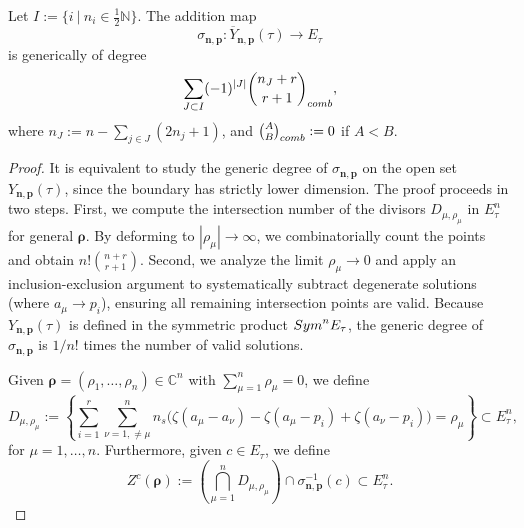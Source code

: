 \documentclass[10pt,a4paper]{amsart}
\begin{document}
\begin{theorem} \label{thm_deg}
Let $I := \{ i\ |\ n_i \in \tfrac{1}{2}\mathbb{N} \}$. The addition map
\[
\sigma_{\mathbf{n},\mathbf{p}}: \overline{Y}_{\mathbf{n},\mathbf{p}}(\tau) \to E_\tau
\] 
is generically of degree 
\[
    \sum_{J \subset I} (-1)^{|J|} \binom{n_J +r}{r+1}_{\rm comb},
\]
where $n_J := n - \sum_{j \in J}(2n_j +1)$, and $\binom{A}{B}_{\rm comb} := 0$ if $A<B$.
\end{theorem}

\begin{proof}
It is equivalent to study the generic degree of $\sigma_{\mathbf{n},\mathbf{p}}$ on the open set $Y_{\mathbf{n}, \mathbf{p}}(\tau)$, since the boundary has strictly lower dimension.
The proof proceeds in two steps. First, we compute the intersection number of the divisors $D_{\mu,\rho_\mu}$ in $E_\tau^n$ for general $\boldsymbol{\rho}$. By deforming to $|\rho_\mu| \to \infty$, we combinatorially count the points and obtain $n! \binom{n+r}{r+1}$. Second, we analyze the limit $\rho_\mu \to 0$ and apply an inclusion-exclusion argument to systematically subtract degenerate solutions (where $a_\mu \to p_i$), ensuring all remaining intersection points are valid. Because $Y_{\mathbf{n},\mathbf{p}}(\tau)$ is defined in the symmetric product ${\rm Sym}^n E_\tau$, the generic degree of $\sigma_{\mathbf{n},\mathbf{p}}$ is $1/n!$ times the number of valid solutions.

Given $\boldsymbol{\rho}=(\rho_1,\dots,\rho_n) \in \mathbb{C}^n$ with $\sum_{\mu=1}^n \rho_\mu=0$, we define 
\[
D_{\mu,\rho_\mu} := \left\{ \sum_{i = 1}^{r} \sum_{\nu = 1, \neq \mu}^n 
n_s\Big(
\zeta(a_\mu - a_\nu) - \zeta(a_\mu - p_i) + \zeta(a_\nu - p_i)
\Big) =  \rho_\mu \right\} \subset E_{\tau}^n,
\]
for $\mu=1,\dots,n$. Furthermore, given $c \in E_\tau$, we define
\[
Z^c(\boldsymbol{\rho}) :=  \left( \bigcap_{\mu=1}^n D_{\mu,\rho_\mu}\right) \cap \sigma_{\mathbf{n},\mathbf{p}}^{-1}(c) \subset E_\tau^n.
\]


\end{proof}
\end{document}
